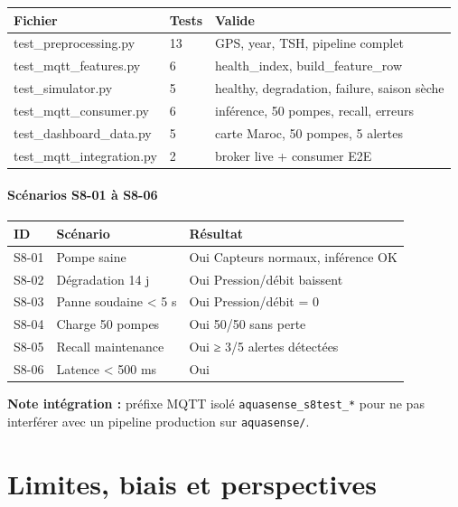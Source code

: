 \documentclass[11pt,a4paper]{report}
\begin{document}
\begin{longtable}{@{}lll@{}}
\toprule
Fichier & Tests & Valide \\
\midrule
test\_preprocessing.py & 13 & GPS, year, TSH, pipeline complet \\
test\_mqtt\_features.py & 6 & health\_index, build\_feature\_row \\
test\_simulator.py & 5 & healthy, degradation, failure, saison sèche \\
test\_mqtt\_consumer.py & 6 & inférence, 50 pompes, recall, erreurs \\
test\_dashboard\_data.py & 5 & carte Maroc, 50 pompes, 5 alertes \\
test\_mqtt\_integration.py & 2 & broker live + consumer E2E \\
\bottomrule
\end{longtable}




\subsubsection{Scénarios S8-01 à S8-06}



\begin{longtable}{@{}lll@{}}
\toprule
ID & Scénario & Résultat \\
\midrule
S8-01 & Pompe saine & Oui Capteurs normaux, inférence OK \\
S8-02 & Dégradation 14 j & Oui Pression/débit baissent \\
S8-03 & Panne soudaine < 5 s & Oui Pression/débit = 0 \\
S8-04 & Charge 50 pompes & Oui 50/50 sans perte \\
S8-05 & Recall maintenance & Oui ≥ 3/5 alertes détectées \\
S8-06 & Latence < 500 ms & Oui \\
\bottomrule
\end{longtable}




\textbf{Note intégration :} préfixe MQTT isolé \texttt{aquasense\_s8test\_*} pour ne pas interférer avec un pipeline production sur \texttt{aquasense/}.





\chapter{Limites, biais et perspectives}
\end{document}
